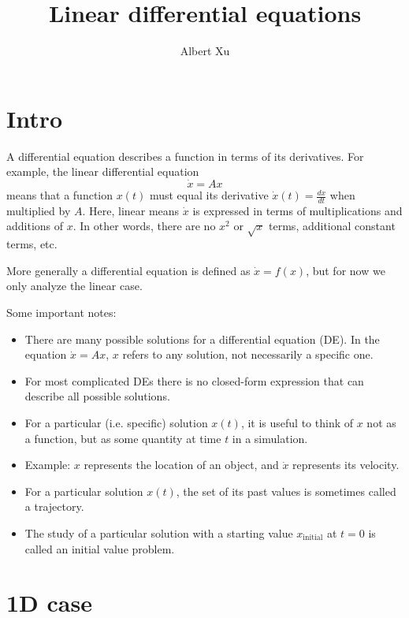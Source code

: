 \documentclass[11pt, oneside]{article}   	%
\title{Linear differential equations}
\author{Albert Xu}
\begin{document}
\maketitle

\section{Intro}

A differential equation describes a function in terms of its derivatives.
For example, the linear differential equation
$$ \dot{x} = Ax $$
means that a function $x(t)$ must equal its derivative $\dot{x}(t) = \frac{dx}{dt}$ when multiplied by $A$.
Here, linear means $\dot{x}$ is expressed in terms of multiplications and additions of $x$.
In other words, there are no $x^2$ or $\sqrt{x}$ terms, additional constant terms, etc.

More generally a differential equation is defined as $\dot{x} = f(x)$,
but for now we only analyze the linear case.

Some important notes:
\begin{itemize}
  \item There are many possible solutions for a differential equation (DE).
  In the equation $\dot{x} = Ax$, $x$ refers to any solution, not necessarily a specific one.
  \item For most complicated DEs there is no closed-form expression that can describe all possible solutions.
  \item For a particular (i.e. specific) solution $x(t)$, it is useful to think of $x$ not as a function, but as some quantity at time $t$ in a simulation.
  \item Example: $x$ represents the location of an object, and $\dot{x}$ represents its velocity.
  \item For a particular solution $x(t)$, the set of its past values is sometimes called a trajectory.
  \item The study of a particular solution with a starting value $x_\mathrm{initial}$ at $t = 0$ is called an initial value problem.
\end{itemize}


\section{1D case}
\end{document}
